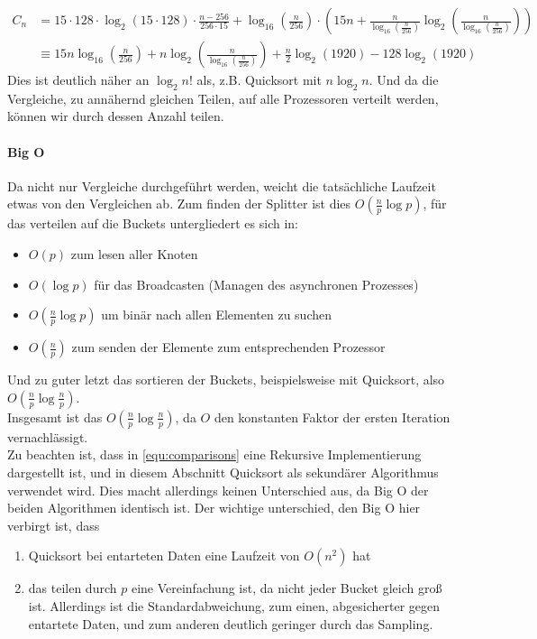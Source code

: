 			\begin{equation}
				\begin{aligned}
					C_n&=15\cdot 128\cdot\log_2\left(15\cdot 128\right)\cdot \frac{n-256}{256\cdot15}+\log_{16}\left(\frac{n}{256}\right)\cdot\left(15n+\frac{n}{\log_{16}\left(\frac{n}{256}\right)}\log_2\left(\frac{n}{\log_{16}\left(\frac{n}{256}\right)}\right)\right)\\
					&\equiv 15n\log_{16}\left(\frac{n}{256}\right)+n\log_{2}\left(\frac{n}{\log_{16}\left(\frac{n}{256}\right)}\right)+\frac{n}{2}\log_2\left(1920\right)-128\log_2\left(1920\right)
				\end{aligned}
			\end{equation}
			Dies ist deutlich näher an $\log_2{n!}$ als, z.B. Quicksort mit $n\log_2{n}$. 
			Und da die Vergleiche, zu annähernd gleichen Teilen, auf alle Prozessoren verteilt werden, können wir durch dessen Anzahl teilen.
			
		\paragraph{Big O}
			Da nicht nur Vergleiche durchgeführt werden, weicht die tatsächliche Laufzeit etwas von den Vergleichen ab.
			Zum finden der Splitter ist dies $O\left(\frac{n}{p}\log{p}\right)$, für das verteilen auf die Buckets untergliedert es sich in: \autocite{wikipedia-contributors-2021}
			\begin{itemize}
				\item $O(p)$ zum lesen aller Knoten
				\item $O(\log{p})$ für das Broadcasten (Managen des asynchronen Prozesses)
				\item $O\left(\frac{n}{p}\log{p}\right)$ um binär nach allen Elementen zu suchen
				\item $O\left(\frac{n}{p}\right)$ zum senden der Elemente zum entsprechenden Prozessor
			\end{itemize}
			Und zu guter letzt das sortieren der Buckets, beispielsweise mit Quicksort, also $O\left(\frac{n}{p}\log{\frac{n}{p}}\right)$.\\
			Insgesamt ist das $O\left(\frac{n}{p}\log{\frac{n}{p}}\right)$, da $O$ den konstanten Faktor der ersten Iteration vernachlässigt.\\
			Zu beachten ist, dass in \ref{equ:comparisons} eine Rekursive Implementierung dargestellt ist, und in diesem Abschnitt Quicksort als sekundärer Algorithmus verwendet wird.
			Dies macht allerdings keinen Unterschied aus, da Big O der beiden Algorithmen identisch ist.
			Der wichtige unterschied, den Big O hier verbirgt ist, dass
			\begin{enumerate}
				\item Quicksort bei entarteten Daten eine Laufzeit von $O\left(n^2\right)$ hat
				\item das teilen durch $p$ eine Vereinfachung ist, da nicht jeder Bucket gleich groß ist. Allerdings ist die Standardabweichung, zum einen, abgesicherter gegen entartete Daten, und zum anderen deutlich geringer durch das Sampling.
			\end{enumerate}
			
